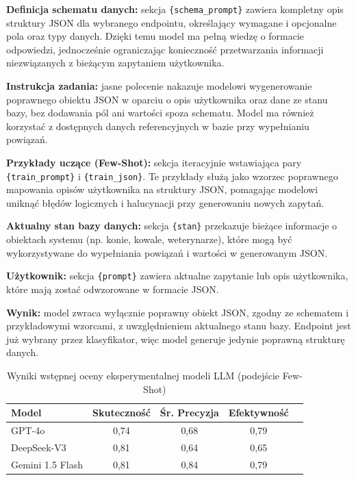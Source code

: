 \begin{description}
    \item \textbf{Definicja schematu danych:} sekcja \texttt{\{schema\_prompt\}} zawiera kompletny opis struktury \textsf{JSON} dla wybranego endpointu, określający wymagane i opcjonalne pola oraz typy danych. Dzięki temu model ma pełną wiedzę o formacie odpowiedzi, jednocześnie ograniczając konieczność przetwarzania informacji niezwiązanych z bieżącym zapytaniem użytkownika.
    \item \textbf{Instrukcja zadania:} jasne polecenie nakazuje modelowi wygenerowanie poprawnego obiektu \textsf{JSON} w oparciu o opis użytkownika oraz dane ze stanu bazy, bez dodawania pól ani wartości spoza schematu. Model ma również korzystać z dostępnych danych referencyjnych w bazie przy wypełnianiu powiązań.
    \item \textbf{Przykłady uczące (Few-Shot):} sekcja iteracyjnie wstawiająca pary \texttt{\{train\_prompt\}} i \texttt{\{train\_json\}}. Te przykłady służą jako wzorzec poprawnego mapowania opisów użytkownika na struktury \textsf{JSON}, pomagając modelowi uniknąć błędów logicznych i halucynacji przy generowaniu nowych zapytań.
    \item \textbf{Aktualny stan bazy danych:} sekcja \texttt{\{stan\}} przekazuje bieżące informacje o obiektach systemu (np. konie, kowale, weterynarze), które mogą być wykorzystywane do wypełniania powiązań i wartości w generowanym \textsf{JSON}.
    \item \textbf{Użytkownik:} sekcja \texttt{\{prompt\}} zawiera aktualne zapytanie lub opis użytkownika, które mają zostać odwzorowane w formacie \textsf{JSON}.
    \item \textbf{Wynik:} model zwraca wyłącznie poprawny obiekt \textsf{JSON}, zgodny ze schematem i przykładowymi wzorcami, z uwzględnieniem aktualnego stanu bazy. Endpoint jest już wybrany przez klasyfikator, więc model generuje jedynie poprawną strukturę danych.
\end{description}

\begin{table}[h!]
\centering
\caption{Wyniki wstępnej oceny eksperymentalnej modeli LLM (podejście Few-Shot)}
\label{tab:llm_few_shot}
\begin{tabular}{|l|c|c|c|c|}
\hline
\textbf{Model} & \textbf{Skuteczność} & \textbf{Śr. Precyzja} & \textbf{Efektywność} \\ \hline
GPT-4o         & 0,74                 & 0,68                  & 0,79                 \\ \hline
DeepSeek-V3    & 0,81                 & 0,64                  & 0,65                 \\ \hline
Gemini 1.5 Flash & 0,81               & 0,84                  & 0,79                 \\ \hline
\end{tabular}
\end{table}

